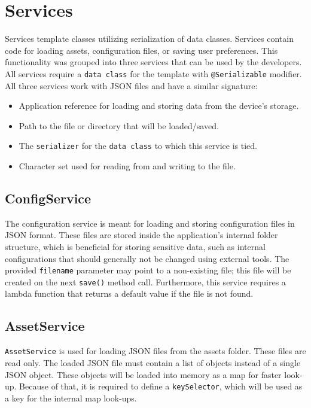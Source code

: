\section{Services}
\label{Services}
Services template classes utilizing serialization of data classes. Services contain code for loading assets, configuration files, or saving user preferences. This functionality was grouped into three services that can be used by the developers. All services require a \texttt{data class} for the template with \texttt{@Serializable} modifier. All three services work with JSON files and have a similar signature:

\begin{itemize}
    \item Application reference for loading and storing data from the device's storage.
    \item Path to the file or directory that will be loaded/saved.
    \item The \texttt{serializer} for the \texttt{data class} to which this service is tied.
    \item Character set used for reading from and writing to the file.
\end{itemize}



\subsection{ConfigService}
\label{ConfigService}
The configuration service is meant for loading and storing configuration files in JSON format. These files are stored inside the application's internal folder structure, which is beneficial for storing sensitive data, such as internal configurations that should generally not be changed using external tools. The provided \texttt{filename} parameter may point to a non-existing file; this file will be created on the next \texttt{save()} method call. Furthermore, this service requires a lambda function that returns a default value if the file is not found.

\subsection{AssetService}
\label{AssetService}
\texttt{AssetService} is used for loading JSON files from the assets folder. These files are read only. The loaded JSON file must contain a list of objects instead of a single JSON object. These objects will be loaded into memory as a map for faster look-up. Because of that, it is required to define a \texttt{keySelector}, which will be used as a key for the internal map look-ups. 

